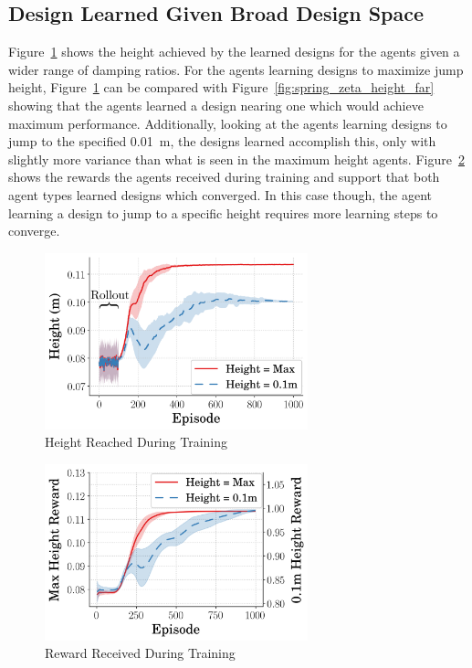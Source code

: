 \documentclass[10pt,twocolumn,letterpaper]{article}
\begin{document}
\subsection{Design Learned Given Broad Design Space}

Figure~\ref{fig:height_vs_step_far} shows the height achieved by the learned designs for the agents given a wider range of damping ratios. For the agents learning designs to maximize jump height, Figure~\ref{fig:height_vs_step_far} can be compared with Figure~\ref{fig:spring_zeta_height_far} showing that the agents learned a design nearing one which would achieve maximum performance. Additionally, looking at the agents learning designs to jump to the specified 0.01~m, the designs learned accomplish this, only with slightly more variance than what is seen in the maximum height agents. Figure~\ref{fig:rew_vs_step_far} shows the rewards the agents received during training and support that both agent types learned designs which converged. In this case though, the agent learning a design to jump to a specific height requires more learning steps to converge. 
%
\begin{figure}[t]
        \begin{center}
        \includegraphics[width = 3in]{figures/design_space_wide/HeightVsTime.png}  
        \caption{Height Reached During Training}
        \label{fig:height_vs_step_far}
        \end{center}
        \end{figure}
%
\begin{figure}[t]
        \begin{center}
        \includegraphics[width = 3in]{figures/design_space_wide/RewVsTime.png}  
        \caption{Reward Received During Training}
        \label{fig:rew_vs_step_far}
        \end{center}
        \end{figure}
%
\end{document}
